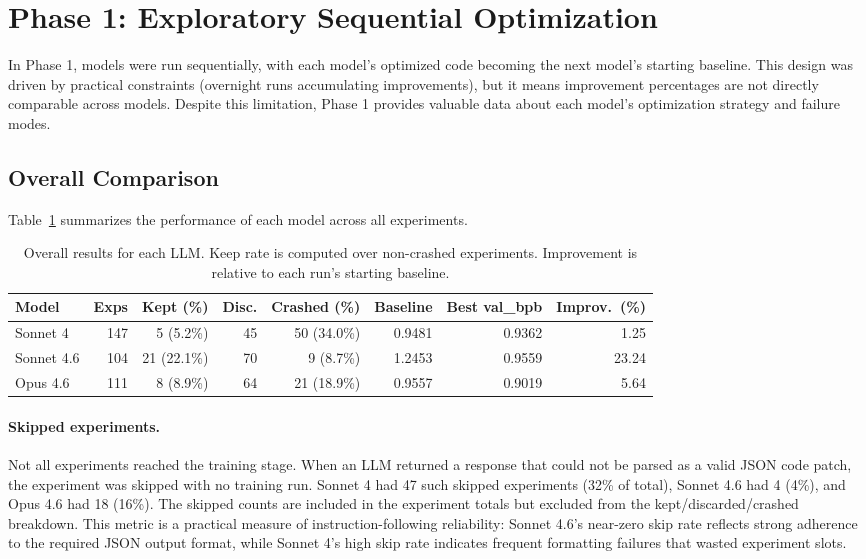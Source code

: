 \documentclass[11pt]{article}
\begin{document}
\section{Phase 1: Exploratory Sequential Optimization}
\label{sec:phase1}

In Phase 1, models were run sequentially, with each model's optimized code becoming the next model's starting baseline. This design was driven by practical constraints (overnight runs accumulating improvements), but it means improvement percentages are not directly comparable across models. Despite this limitation, Phase 1 provides valuable data about each model's optimization strategy and failure modes.

\subsection{Overall Comparison}
\label{sec:overall}

Table~\ref{tab:results} summarizes the performance of each model across all experiments.

\begin{table}[H]
\centering
\caption{Overall results for each LLM. Keep rate is computed over non-crashed experiments. Improvement is relative to each run's starting baseline.}
\label{tab:results}
\begin{tabular}{lrrrrrrr}
\toprule
\textbf{Model} & \textbf{Exps} & \textbf{Kept (\%)} & \textbf{Disc.} & \textbf{Crashed (\%)} & \textbf{Baseline} & \textbf{Best val\_bpb} & \textbf{Improv.\ (\%)} \\
\midrule
Sonnet 4     & 147 & 5 (5.2\%)   & 45 & 50 (34.0\%) & 0.9481 & 0.9362 & 1.25 \\
Sonnet 4.6   & 104 & 21 (22.1\%) & 70 & 9 (8.7\%)   & 1.2453 & 0.9559 & 23.24 \\
Opus 4.6     & 111 & 8 (8.9\%)  & 64 & 21 (18.9\%) & 0.9557 & 0.9019 & 5.64 \\
\bottomrule
\end{tabular}
\end{table}

\paragraph{Skipped experiments.} Not all experiments reached the training stage. When an LLM returned a response that could not be parsed as a valid JSON code patch, the experiment was skipped with no training run. Sonnet 4 had 47 such skipped experiments (32\% of total), Sonnet 4.6 had 4 (4\%), and Opus 4.6 had 18 (16\%). The skipped counts are included in the experiment totals but excluded from the kept/discarded/crashed breakdown. This metric is a practical measure of instruction-following reliability: Sonnet 4.6's near-zero skip rate reflects strong adherence to the required JSON output format, while Sonnet 4's high skip rate indicates frequent formatting failures that wasted experiment slots.
\end{document}
